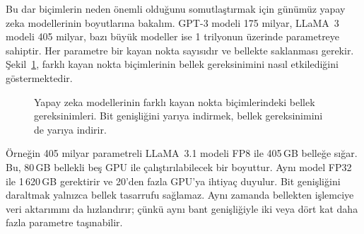Bu dar biçimlerin neden önemli olduğunu somutlaştırmak için günümüz yapay zeka modellerinin boyutlarına bakalım. GPT-3 modeli 175 milyar, LLaMA~3 modeli 405 milyar, bazı büyük modeller ise 1 trilyonun üzerinde parametreye sahiptir. Her parametre bir kayan nokta sayısıdır ve bellekte saklanması gerekir. Şekil~\ref{fig:model-bellek}, farklı kayan nokta biçimlerinin bellek gereksinimini nasıl etkilediğini göstermektedir.

\begin{figure}[htbp]
\centering
{}
\caption[Yapay zeka modellerinin kayan nokta biçimine göre bellek gereksinimleri]{Yapay zeka modellerinin farklı kayan nokta biçimlerindeki bellek gereksinimleri. Bit genişliğini yarıya indirmek, bellek gereksinimini de yarıya indirir.}
\label{fig:model-bellek}
\end{figure}

Örneğin 405 milyar parametreli LLaMA~3.1 modeli FP8 ile 405\,GB belleğe sığar. Bu, 80\,GB bellekli beş GPU ile çalıştırılabilecek bir boyuttur. Aynı model FP32 ile 1\,620\,GB gerektirir ve 20'den fazla GPU'ya ihtiyaç duyulur. Bit genişliğini daraltmak yalnızca bellek tasarrufu sağlamaz. Aynı zamanda bellekten işlemciye veri aktarımını da hızlandırır; çünkü aynı bant genişliğiyle iki veya dört kat daha fazla parametre taşınabilir.

